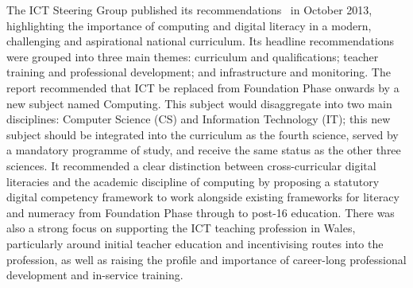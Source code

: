 \documentclass{llncs}
\begin{document}




The ICT Steering Group published its
recommendations~\cite{welshictreview:2013} in October 2013,
highlighting the importance of computing and digital literacy in a
modern, challenging and aspirational national curriculum. Its headline
recommendations were grouped into three main themes: curriculum and
qualifications; teacher training and professional development; and
infrastructure and monitoring. The report recommended that ICT be
replaced from Foundation Phase onwards by a new subject named
Computing.  This subject would disaggregate into two main disciplines:
Computer Science (CS) and Information Technology (IT); this new
subject should be integrated into the curriculum as the fourth
science, served by a mandatory programme of study, and receive the
same status as the other three sciences. It recommended a clear
distinction between cross-curricular digital literacies and the
academic discipline of computing by proposing a statutory digital
competency framework to work alongside existing frameworks for
literacy and numeracy from Foundation Phase through to post-16
education. There was also a strong focus on supporting the ICT teaching
profession in Wales, particularly around initial teacher education and
incentivising routes into the profession, as well as raising the
profile and importance of career-long professional development and
in-service training.
\end{document}
